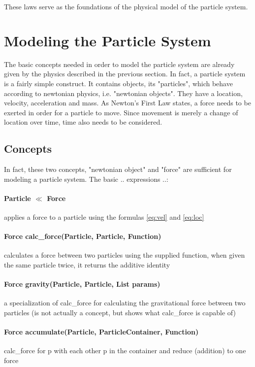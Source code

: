 \documentclass[runningheads,a4paper]{llncs}
\begin{document}
\cite{wiki}

These laws serve as the foundations of the physical model of the particle system. 

\section{Modeling the Particle System}
The basic concepts needed in order to model the particle system are already given by the physics described in the previous section. In fact, a particle system is a fairly simple construct. It contains objects, its "particles", which behave according to newtonian physics, i.e. "newtonian objects". They have a location, velocity, acceleration and mass. As Newton's First Law states, a force needs to be exerted in order for a particle to move. Since movement is merely a change of location over time, time also needs to be considered.

\subsection{Concepts}
In fact, these two concepts, "newtonian object" and "force" are sufficient for modeling a particle system. The basic .. expressions ..:

\paragraph{Particle $\ll$ Force}
applies a force to a particle using the formulas \ref{eq:vel} and \ref{eq:loc}

\paragraph{Force calc\_force(Particle, Particle, Function)}
calculates a force between two particles using the supplied function, when given the same particle twice, it returns the additive identity

\paragraph{Force gravity(Particle, Particle, List params)}
a specialization of calc\_force for calculating the gravitational force between two particles (is not actually a concept, but shows what calc\_force is capable of)

\paragraph{Force accumulate(Particle, ParticleContainer, Function)}
calc\_force for p with each other p in the container and reduce (addition) to one force
\end{document}
